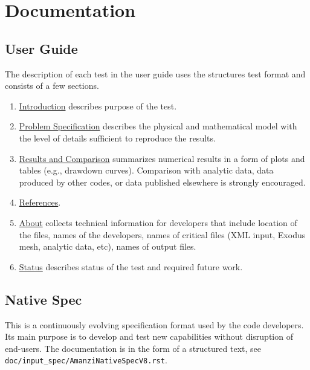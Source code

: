 %
%

\section{Documentation}

\subsection{User Guide}
The description of each test in the user guide uses the structures test format
and consists of a few sections.

\begin{enumerate}
\item \underline{Introduction} describes purpose of the test.
\item \underline{Problem Specification} describes the physical and mathematical model 
      with the level of details sufficient to reproduce the results.
\item \underline{Results and Comparison} summarizes numerical results in a form of plots
      and tables (e.g., drawdown curves). Comparison with analytic data, data produced 
      by other codes, or data published elsewhere is strongly encouraged.
\item \underline{References}.
\item \underline{About} collects technical information for developers that include 
      location of the files, names of the developers, names of critical files (XML input,
      Exodus mesh, analytic data, etc), names of output files.
\item \underline{Status} describes status of the test and required future work.
\end{enumerate}


\subsection{Native Spec}
This is a continuously evolving specification format used by the code developers. 
Its main purpose is to develop and test new capabilities without disruption of end-users.
The documentation is in the form of a structured text, see {\tt doc/input\_spec/AmanziNativeSpecV8.rst}.



